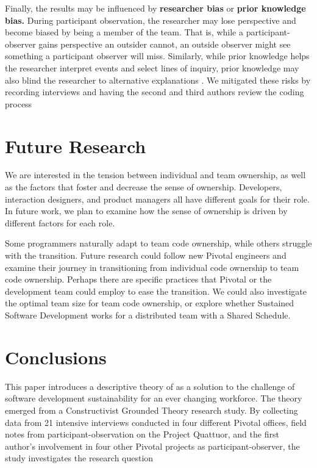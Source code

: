 Finally, the results may be influenced by \textbf{researcher bias} or \textbf{prior knowledge bias.}  
During participant observation, the researcher may lose perspective and become biased by being a member of the team. That is, while a participant-observer gains perspective an outsider cannot, an outside observer might see something a participant observer will miss. Similarly, while prior knowledge helps the researcher interpret events and select lines of inquiry, prior knowledge may also blind the researcher to alternative explanations \cite{GlaserIssues}. We mitigated these risks by recording interviews and having the second and third authors review the coding process
\section{Future Research}
We are interested in the tension between individual and team ownership, as well as the factors that foster and decrease the sense of ownership. Developers, interaction designers, and product managers all have different goals for their role. In future work, we plan to examine how the sense of ownership is driven by different factors for each role.

Some programmers naturally adapt to team code ownership, while others struggle with the transition. Future research could follow new Pivotal engineers and examine their journey in transitioning from individual code ownership to team code ownership. Perhaps there are 
specific practices that Pivotal or the development team could employ to ease the transition. We could also investigate the optimal team size for team code ownership, or explore whether Sustained Software Development works for a distributed team with a Shared Schedule.
\section{Conclusions}
This paper introduces a descriptive theory of  as a solution to the challenge of software development sustainability for an ever changing workforce. The theory emerged from a Constructivist Grounded Theory research study. By collecting data from 21 intensive interviews conducted in four different Pivotal offices, field notes from participant-observation on the Project Quattuor, and the first author’s involvement in four other Pivotal projects as participant-observer, the study investigates the research question 

